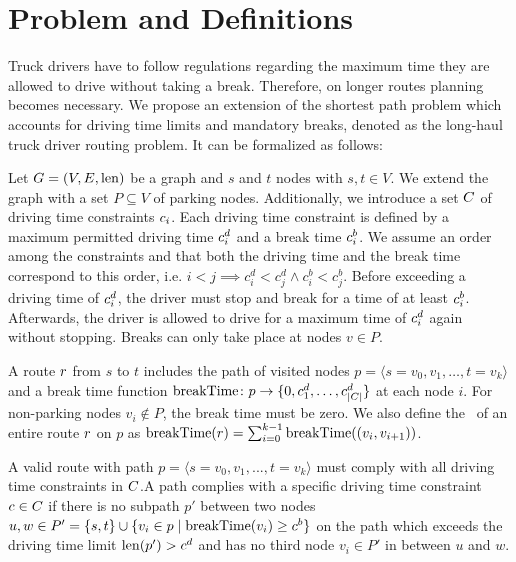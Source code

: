 
\chapter{Problem and Definitions}\label{chapter:problem_definitions}
Truck drivers have to follow regulations regarding the maximum time they are allowed to drive without taking a break. Therefore, on longer routes planning becomes necessary. We propose an extension of the shortest path problem which accounts for driving time limits and mandatory breaks, denoted as the long-haul truck driver routing problem. It can be formalized as follows:

Let $G=(V,E,\operatorname{len})$ be a graph and $s$ and $t$ nodes with $s,t \in V$. We extend the graph with a set $P \subseteq V$ of parking nodes. Additionally, we introduce a set $C$ of driving time constraints $c_i$. Each driving time constraint is defined by a maximum permitted driving time $c_i^d$ and a break time $c_i^b$. We assume an order among the constraints and that both the driving time and the break time correspond to this order, i.e. $i<j \implies c_i^d < c_j^d \wedge c_i^b < c_j^b$. Before exceeding a driving time of $c_i^d$, the driver must stop and break for a time of at least $c_i^b$. Afterwards, the driver is allowed to drive for a maximum time of $c_i^d$ again without stopping. Breaks can only take place at nodes $v \in P$.

A route $r$ from $s$ to $t$ includes the path of visited nodes $p = \langle s=v_0,v_1,\dots,t=v_k \rangle$ and a break time function $\operatorname{breakTime}\colon p \rightarrow \{0,c_1^d,\dots,c_{|C|}^d\}$ at each node $i$. For non-parking nodes $v_i \notin P$, the break time must be zero. We also define the \breakTime\ of an entire route $r$ on $p$ as $\operatorname{breakTime}(r) = \sum_{i=0}^{k-1}{\operatorname{breakTime}((v_i,v_{i+1}))}$.

\begin{definition}
	A valid route with path $p = \langle s=v_0,v_1,...,t=v_k \rangle$ must comply with all driving time constraints in $C$.A path complies with a specific driving time constraint $c \in C$ if there is no subpath $p'$ between two nodes $u,w \in P' = \{s,t\} \cup \{v_i \in p \mid \operatorname{breakTime}(v_i) \ge c^b\}$ on the path which exceeds the driving time limit $\operatorname{len}(p') > c^d$ and has no third node $v_i \in P'$ in between $u$ and $w$.
\end{definition}

